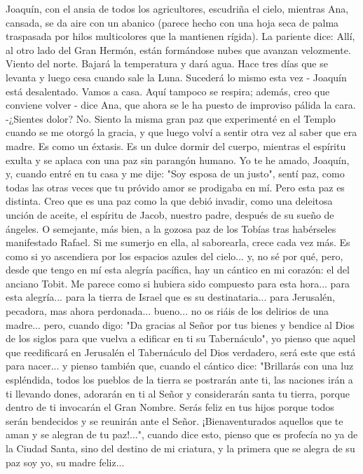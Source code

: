 \documentclass[12pt]{book} %
\begin{document}
Joaquín, con el ansia de todos los agricultores, escudriña el cielo, mientras Ana, cansada, se da aire con un abanico (parece hecho con una hoja seca de palma traspasada por hilos multicolores que la mantienen rígida). 
La pariente dice: 
Allí, al otro lado del Gran Hermón, están formándose nubes que avanzan velozmente. Viento del norte. Bajará la temperatura y dará agua. 
Hace tres días que se levanta y luego cesa cuando sale la Luna. Sucederá lo mismo esta vez - Joaquín está desalentado. 
Vamos a casa. Aquí tampoco se respira; además, creo que conviene volver - dice Ana, que ahora se le ha puesto de 
improviso pálida la cara.  
-¿Sientes dolor?                       
No. Siento la misma gran paz que experimenté en el Templo cuando se me otorgó la gracia, y que luego volví a sentir 
otra vez al saber que era madre. Es como un éxtasis. Es un dulce dormir del cuerpo, mientras el espíritu exulta y se aplaca con una paz sin parangón humano. Yo te he amado, Joaquín, y, cuando entré en tu casa y me dije: "Soy esposa de un justo", sentí paz, como todas las otras veces que tu próvido amor se prodigaba en mí. Pero esta paz es distinta. Creo que es una paz como la que debió invadir, como una deleitosa unción de aceite, el espíritu de Jacob, nuestro padre, después de su sueño de ángeles. O semejante, más bien, a la gozosa paz de los Tobías tras habérseles manifestado Rafael. Si me sumerjo en ella, al saborearla, crece cada vez más. Es como si yo ascendiera por los espacios azules del cielo... y, no sé por qué, pero, desde que tengo en mí esta alegría pacífica, hay un cántico en mi corazón: el del anciano Tobit. Me parece como si hubiera sido compuesto para esta hora... para esta alegría... para la tierra de Israel que es su destinataria... para Jerusalén, pecadora, mas ahora perdonada... bueno... no os riáis de los delirios de una madre... pero, cuando digo: "Da gracias al Señor por tus bienes y bendice al Dios de los siglos para que vuelva a edificar en ti su Tabernáculo", yo pienso que aquel que reedificará en Jerusalén el Tabernáculo del Dios verdadero, será este que está para nacer... y pienso también que, cuando el cántico dice: "Brillarás con una luz espléndida, todos los pueblos de la tierra se postrarán ante ti, las naciones irán a ti llevando dones, adorarán en ti al Señor y considerarán santa tu tierra, porque dentro de ti invocarán el Gran Nombre. Serás feliz en tus hijos porque todos serán bendecidos y se reunirán ante el Señor. ¡Bienaventurados aquellos que te aman y se alegran de tu paz!...", cuando dice esto, pienso que es profecía no ya de la Ciudad Santa, sino del destino de mi criatura, y la primera que se alegra de su paz soy yo, su madre feliz... 
\end{document}
